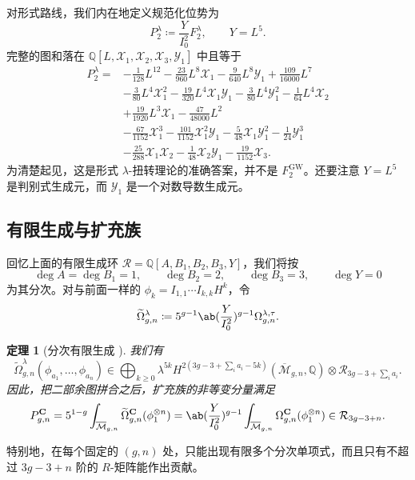 \documentclass{amsart}
\newtheorem{thm}{定理}[section]
\theoremstyle{definition}
\theoremstyle{remark}
\theoremstyle{plain}
\theoremstyle{definition}
\theoremstyle{remark}
\newcommand{\Q}{\mathbb{Q}}
\newcommand{\Mbar}{\overline{\mathcal{M}}}
\newcommand{\mc}[1]{\mathcal{#1}}
\newcommand{\mbf}[1]{\mathbf{#1}}
\newcommand{\mr}[1]{\mathrm{#1}}
\newcommand{\wt}[1]{\widetilde{#1}}
\newcommand{\1}{\mathbf{1}}
\newcommand{\2}{\mathbf{2}}
\newcommand{\3}{\mathbf{3}}
\begin{document}
对形式路线，我们内在地定义规范化位势为
\[ P_2^{\lambda} \coloneqq \frac{Y}{I_0^2}F_2^{\lambda}, \qquad Y = L^5. \]
完整的图和落在 \(\Q[L,\mc{X}_1,\mc{X}_2,\mc{X}_3,\mc{Y}_1]\) 中且等于
\begin{align*}
    P_2^{\lambda} ={}& -\frac{1}{128}L^{12} - \frac{23}{960}L^8\mc{X}_1 - \frac{9}{640}L^8\mc{Y}_1 + \frac{109}{16000}L^7 \\
    &- \frac{3}{80}L^4\mc{X}_1^2 - \frac{19}{320}L^4\mc{X}_1\mc{Y}_1 - \frac{3}{80}L^4\mc{Y}_1^2 - \frac{1}{64}L^4\mc{X}_2 \\
    &+ \frac{19}{1920}L^3\mc{X}_1 - \frac{47}{48000}L^2 \\
    &- \frac{67}{1152}\mc{X}_1^3 - \frac{101}{1152}\mc{X}_1^2\mc{Y}_1 - \frac{5}{48}\mc{X}_1\mc{Y}_1^2 - \frac{1}{24}\mc{Y}_1^3 \\
    &- \frac{25}{288}\mc{X}_1\mc{X}_2 - \frac{1}{48}\mc{X}_2\mc{Y}_1 - \frac{19}{1152}\mc{X}_3.
\end{align*}
为清楚起见，这是形式 \(\lambda\)-扭转理论的准确答案，并不是 \(F_2^{\mr{GW}}\)。还要注意 \(Y = L^5\) 是判别式生成元，而 \(\mc{Y}_1\) 是一个对数导数生成元。

\subsection{有限生成与扩充族}%
\label{sub:Finite generation and the extended family}

回忆上面的有限生成环 \(\mc{R} = \Q[A,B_1,B_2,B_3,Y]\)，我们将按
\[ \deg A = \deg B_1 = 1, \qquad \deg B_2 = 2, \qquad \deg B_3 = 3, \qquad \deg Y = 0 \]
为其分次。对与前面一样的 \(\phi_k = I_{1,1}\cdots I_{k,k}H^k\)，令
\[ \wt{\Omega}^{\lambda}_{g,n} \coloneqq 5^{g-1}\ab(\frac{Y}{I_0^2})^{g-1}\Omega^{\lambda,\tau}_{g,n}. \]

\begin{thm}[分次有限生成 {\cite{GJRstructure}}]%
\label{thm:graded finite generation}
    我们有
    \[ \wt{\Omega}^{\lambda}_{g,n}(\phi_{a_1}, \ldots, \phi_{a_n}) \in \bigoplus_{k \geq 0}\lambda^{5k}H^{2(3g-3+\sum_i a_i - 5k)}(\Mbar_{g,n},\Q)\otimes \mc{R}_{3g-3+\sum_i a_i}. \]
    因此，把二部余图拼合之后，扩充族的非等变分量满足
    \[ P^{\mbf{C}}_{g,n} = 5^{1-g}\int_{\Mbar_{g,n}}\wt{\Omega}^{\mbf{C}}_{g,n}(\phi_1^{\otimes n}) = \ab( \frac{Y}{I_0^2})^{g-1}\int_{\Mbar_{g,n}}\Omega^{\mbf{C}}_{g,n}(\phi_1^{\otimes n}) \in \mc{R}_{3g-3+n}. \]
\end{thm}

特别地，在每个固定的 \((g,n)\) 处，只能出现有限多个分次单项式，而且只有不超过 \(3g-3+n\) 阶的 \(R\)-矩阵能作出贡献。
\end{document}
